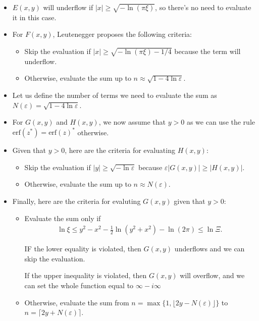 \documentclass[10pt]{article}
\newcommand{\erf}{\mathrm{erf}}
\begin{document}
\begin{itemize}
    \item $E(x,y)$ will underflow if $|x| \geq \sqrt{-\ln(\pi\xi)}$, so there's no need to evaluate it in this case.
    
    \item For $F(x,y)$, Leutenegger proposes the following criteria:
    \begin{itemize}
      \item Skip the evaluation if $|x| \geq \sqrt{-\ln(\pi\xi) - 1/4}$ because the term will underflow.
      \item Otherwise, evaluate the sum up to $n \approx \sqrt{1 - 4\ln \varepsilon}$.      
    \end{itemize}
    
    \item Let us define the number of terms we need to evaluate the sum as $N(\varepsilon) = \sqrt{1-4\ln \varepsilon}$.
    
    \item For $G(x,y)$ and $H(x,y)$, we now assume that $y > 0$ as we can use the rule $\erf(z^*) = \erf(z)^*$ otherwise.
    
    \item Given that $y > 0$, here are the criteria for evaluating $H(x,y)$:
    \begin{itemize}
      \item Skip the evaluation if $|y| \geq \sqrt{-\ln \varepsilon}$ because $\varepsilon|G(x,y)| \geq |H(x,y)|$.
      \item Otherwise, evaluate the sum up to $n \approx N(\varepsilon)$.
    \end{itemize}
        
    
    \item Finally, here are the criteria for evaluting $G(x,y)$ given that $y > 0$:
    \begin{itemize}
      \item Evaluate the sum only if 
      \begin{align*}
        \ln \xi \leq y^2 - x^2 - \frac{1}{2}\ln(y^2 + x^2) - \ln(2\pi) \leq \ln \Xi.
      \end{align*}
      
      IF the lower equality is violated, then $G(x,y)$ underflows and we can skip the evaluation. 
      
      If the upper inequality is violated, then $G(x,y)$ will overflow, and we can set the whole function equal to $\infty - i\infty$
      
      \item Otherwise, evaluate the sum from $n = \max\{1, \lfloor 2y - N(\varepsilon) \rfloor\}$ to $n = \lceil 2y + N(\varepsilon) \rceil$.             
    \end{itemize}
    

\end{itemize}
\end{document}
